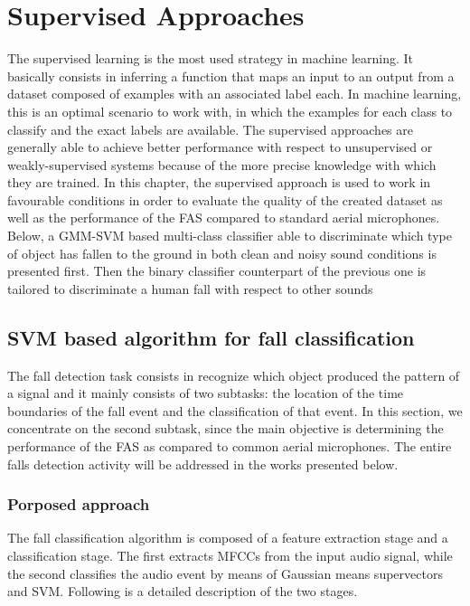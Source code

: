 \chapter{Supervised Approaches}
\label{ch:supervised_approaches}
The supervised learning is the most used strategy in machine learning. It basically consists in inferring a function that maps an input to an output from a dataset composed of examples with an associated label each. In machine learning, this is an optimal scenario to work with, in which the examples for each class to classify and the exact labels are available. %
The supervised approaches are generally able to achieve better performance with respect to unsupervised or weakly-supervised systems because of the more precise knowledge with which they are trained. In this chapter, the supervised approach is used to work in favourable conditions in order to evaluate the quality of the created dataset as well as the performance of the FAS compared to standard aerial microphones. Below, a GMM-SVM based multi-class classifier able to discriminate which type of object has fallen to the ground in both clean and noisy sound conditions is presented first. Then the binary classifier counterpart of the previous one is tailored to discriminate a human fall with respect to other sounds


\section{SVM based algorithm for fall classification}
\label{sec:algorithm_svm_multiclass}
The fall detection task consists in recognize which object produced the pattern of a signal and it mainly consists of two subtasks: the location of the time boundaries of the fall event and the classification of that event. In this section, we concentrate on the second subtask, since the main objective is determining the performance of the FAS as compared to common aerial microphones. The entire falls detection activity will be addressed in the works presented below.

\subsection{Porposed approach}
The fall classification algorithm is composed of a feature extraction stage and a classification stage. The first extracts MFCCs from the input audio signal, while the second classifies the audio event by means of Gaussian means supervectors and SVM. Following is a detailed description of the two stages.

